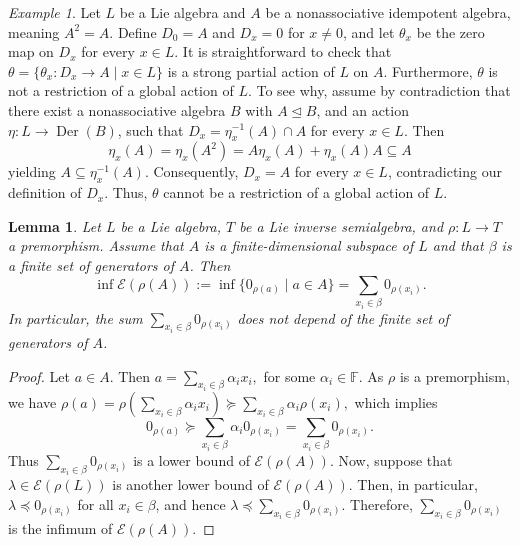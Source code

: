 \documentclass{amsart}
\newcommand{\E}{\mathcal{E}}
\newcommand{\F}{\mathbb{F}}
\newcommand{\0}{{\vartheta}}
\newtheorem{lem}[thm]{Lemma}
\theoremstyle{definition}
\theoremstyle{remark}
\newtheorem{ex}[thm]{Example}
\numberwithin{equation}{section}
\newtheorem*{Theorem A}{\textbf{Theorem A}}
\newtheorem*{Corollary E}{\textbf{Corollary E}}
\newtheorem*{Corollary F}{\textbf{Corollary F}}
\newtheorem*{Theorem B}{\textbf{Theorem B}}
\newtheorem*{Theorem C}{\textbf{Theorem C}}
\newtheorem*{Theorem D}{\textbf{Theorem B}}
\newtheorem*{p a}{\textbf{Proof of  Theorem A}}
\newtheorem*{p b}{\textbf{Proof of Theorem B}}
\newtheorem*{p c}{\textbf{Proof of  Theorem C}}
\newtheorem*{p d}{\textbf{Proof of  Theorem D}}
\DeclareMathOperator{\der}{Der}
\DeclareMathOperator{\pen}{\textsf{PEnd}}
\DeclareMathOperator{\pde}{\textsf{PDer}}
\begin{document}
\begin{ex}
Let $L$ be a Lie algebra and $A$ be a nonassociative idempotent algebra, meaning $A^2=A$. Define $D_0=A$ and $D_x=0$ for $x\neq 0$, and  let $\theta_x$ be the zero map on $D_x$ for every $x\in L$. It is straightforward to check that  $\theta=\{\theta_x: D_{x} \rightarrow A\mid x\in L \}$ is a strong partial action of $L$ on $A$. Furthermore, $\theta$ is not a restriction of a global action of $L$. To see why, assume by contradiction that there exist a nonassociative algebra $B$ with $A\unlhd B$, and an action  $\eta: L\to \der(B)$, such that $D_x=\eta_x^{-1}(A)\cap A$ for every $x\in L$. Then $$\eta_x(A)=\eta_x(A^2)=A\eta_x(A)+\eta_x(A)A\subseteq A$$
yielding $A\subseteq \eta_x^{-1}(A)$. Consequently, $D_x=A$ for every $x\in L$, contradicting our  definition of $D_x$. Thus, $\theta$ cannot be a restriction of a global action of 
$L.$
\end{ex}






\begin{lem}\label{welldefined}
Let $L$ be a Lie algebra, $T$ be  a Lie inverse semialgebra, and $\rho: L\to T$ a premorphism. Assume that $A$ is a finite-dimensional subspace of $L$ and that $\beta$ is a finite set of generators of $A$. Then   
$$\inf \E(\rho(A)):=\inf\{0_{\rho(a)}\mid a\in A\}=\sum_{x_i\in \beta} 0_{\rho(x_i)}.$$ 
In particular, the sum $\sum_{x_i\in \beta} 0_{\rho(x_i)}$ does not depend of the finite set of generators of $A$. 
\end{lem}
\begin{proof}
Let $a\in A$. Then $a=\sum_{x_i\in \beta}\alpha_ix_{i},$ for some $\alpha_i\in \F$. As $\rho$ is a premorphism, we have $\rho(a)=\rho (\sum_{x_i\in \beta}\alpha_ix_{i}) 
\succeq \sum_{x_i\in \beta}\alpha_i\rho(x_{i}),$ which implies
$$0_{\rho(a)}\succeq\sum_{x_i\in \beta}\alpha_i0_{\rho(x_i)}=\sum_{x_i\in \beta}0_{\rho(x_i)}.$$
Thus $\sum_{x_i\in \beta}0_{\rho(x_i)}$ is a lower bound of $\E(\rho(A))$. Now, suppose that $\lambda\in \E(\rho(L))$ is another lower bound of $\E(\rho(A)).$ Then, in particular, $\lambda\preceq 0_{\rho(x_i)}$ for all $x_i\in \beta$, and hence $\lambda\preceq \sum_{x_i\in \beta}0_{\rho(x_i)}.$ Therefore, $\sum_{x_i\in \beta}0_{\rho(x_i)}$ is the infimum of $\E(\rho(A))$.
\end{proof}
\end{document}
